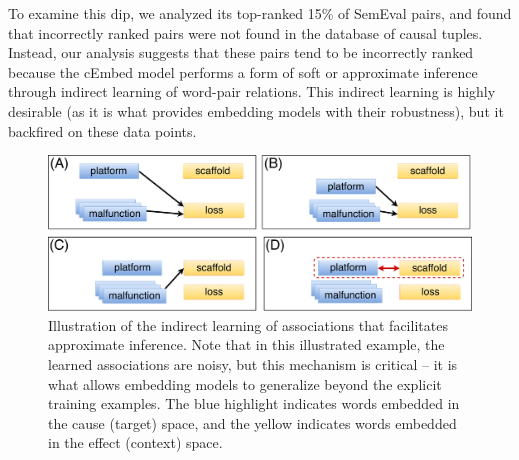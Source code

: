 To examine this dip, we analyzed its top-ranked 15\% of SemEval pairs, and found that incorrectly ranked pairs were not found in the database of causal tuples.  
Instead, our analysis suggests that these pairs tend to be incorrectly ranked because the cEmbed model performs a form of soft or approximate inference through indirect learning of word-pair relations.  
This indirect learning is highly desirable (as it is what provides embedding models with their robustness), but it backfired on these data points.  

\begin{figure}[t]
\begin{center}
\includegraphics[width=\linewidth]{mainmatter/emnlp2016-causal/emnlp_inference.pdf} %
\caption{{Illustration of the indirect learning of associations that facilitates approximate inference.  Note that in this illustrated example, the learned associations are noisy, but this mechanism is critical -- it is what allows embedding models to generalize beyond the explicit training examples.  The blue highlight indicates words embedded in the cause (target) space, and the yellow indicates words embedded in the effect (context) space.}}
\label{fig:inference}
\end{center}
\end{figure}


